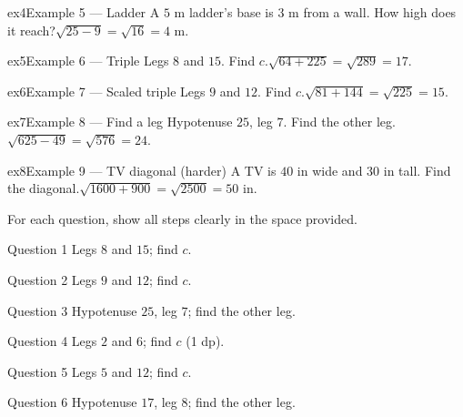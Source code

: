 \documentclass[11pt]{article}
\begin{document}
\begin{example}{ex4}{Example 5 --- Ladder}
A $5$ m ladder's base is $3$ m from a wall. How high does it reach?\soln $\sqrt{25-9}=\sqrt{16}=4$ m.
\end{example}

\begin{example}{ex5}{Example 6 --- Triple}
Legs $8$ and $15$. Find $c$.\soln $\sqrt{64+225}=\sqrt{289}=17$.
\end{example}

\begin{example}{ex6}{Example 7 --- Scaled triple}
Legs $9$ and $12$. Find $c$.\soln $\sqrt{81+144}=\sqrt{225}=15$.
\end{example}

\begin{example}{ex7}{Example 8 --- Find a leg}
Hypotenuse $25$, leg $7$. Find the other leg.\soln $\sqrt{625-49}=\sqrt{576}=24$.
\end{example}

\begin{example}{ex8}{Example 9 --- TV diagonal (harder)}
A TV is $40$ in wide and $30$ in tall. Find the diagonal.\soln $\sqrt{1600+900}=\sqrt{2500}=50$ in.
\end{example}

\clearpage
{}
For each question, show all steps clearly in the space provided.

\begin{qbox}{Question 1}
Legs $8$ and $15$; find $c$.\workspace{2.0cm}
\end{qbox}

\begin{qbox}{Question 2}
Legs $9$ and $12$; find $c$.\workspace{2.0cm}
\end{qbox}

\begin{qbox}{Question 3}
Hypotenuse $25$, leg $7$; find the other leg.\workspace{2.2cm}
\end{qbox}

\begin{qbox}{Question 4}
Legs $2$ and $6$; find $c$ (1 dp).\workspace{2.0cm}
\end{qbox}

\begin{qbox}{Question 5}
Legs $5$ and $12$; find $c$.\workspace{2.0cm}
\end{qbox}

\begin{qbox}{Question 6}
Hypotenuse $17$, leg $8$; find the other leg.\workspace{2.2cm}
\end{qbox}
\end{document}
